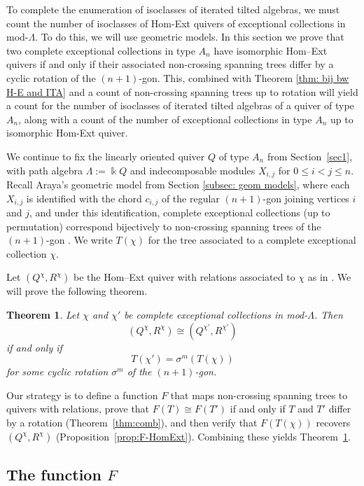 \documentclass[12pt]{amsart}
\newtheorem{thm}{Theorem}[section]
\theoremstyle{definition}
\theoremstyle{remark}
\numberwithin{equation}{section}
\newcommand{\kk}{\ensuremath{\Bbbk}}
\begin{document}
To complete the enumeration of isoclasses of iterated tilted algebras, we must count the number of isoclasses of Hom-Ext quivers of exceptional collections in mod-$\Lambda$. To do this, we will use geometric models. In this section we prove that two complete exceptional collections in type \(A_n\) have isomorphic Hom--Ext quivers if and only if their associated non-crossing spanning trees differ by a cyclic rotation of the \((n+1)\)-gon. This, combined with Theorem \ref{thm: bij bw H-E and ITA} and a count of non-crossing spanning trees up to rotation will yield a count for the number of isoclasses of iterated tilted algebras of a quiver of type $A_n$, along with a count of the number of exceptional collections in type $A_n$ up to isomorphic Hom-Ext quiver.

We continue to fix the linearly oriented quiver \(Q\) of type \(A_n\) from Section~\ref{sec1}, with path algebra \(\Lambda := \kk Q\) and indecomposable modules \(X_{i,j}\) for \(0 \le i < j \le n\). Recall Araya's geometric model \cite{araya2013exceptional} from Section \ref{subsec: geom models}, where each \(X_{i,j}\) is identified with the chord \(c_{i,j}\) of the regular \((n+1)\)-gon joining vertices \(i\) and \(j\), and under this identification, complete exceptional collections (up to permutation) correspond bijectively to non-crossing spanning trees of the \((n+1)\)-gon \cite[Theorem 2.5]{araya2013exceptional}. We write \(T(\chi)\) for the tree associated to a complete exceptional collection \(\chi\). 

Let \((Q^\chi,R^\chi)\) be the Hom--Ext quiver with relations associated to \(\chi\) as in \cite[Definitions 3.1 and 3.3]{igusa2025hom}. We will prove the following theorem.

\begin{thm}\label{thm:main} Let \(\chi\) and \(\chi'\) be complete exceptional collections in mod-\(\Lambda\). Then
\[
(Q^\chi,R^\chi) \cong (Q^{\chi'},R^{\chi'})
\]
if and only if
\[
T(\chi')=\sigma^m(T(\chi))
\]
for some cyclic rotation \(\sigma^m\) of the \((n+1)\)-gon.
\end{thm}

Our strategy is to define a function \(F\) that maps non-crossing spanning trees to quivers with relations, prove that \(F(T) \cong F(T')\) if and only if \(T\) and \(T'\) differ by a rotation (Theorem~\ref{thm:comb}), and then verify that \(F(T(\chi))\)
recovers \((Q^\chi, R^\chi)\) (Proposition~\ref{prop:F-HomExt}). Combining these yields Theorem~\ref{thm:main}.

\subsection{The function \(F\)}
\label{subsec: F}
\end{document}

